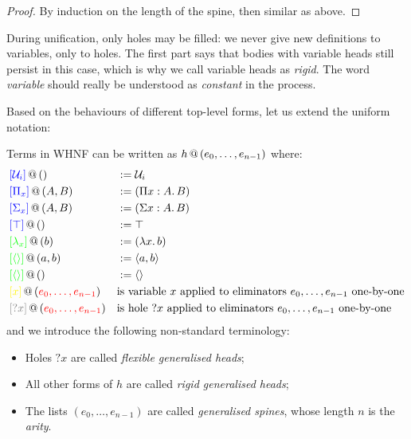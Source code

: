 \documentclass[twoside]{report}
\begin{document}
\begin{proof}
    By induction on the length of the spine, then similar as above.
\end{proof}

During unification, only holes may be filled: we never give new definitions to variables, only to holes. The first part says that bodies with variable heads still persist in this case, which is why we call variable heads as \emph{rigid}. The word \emph{variable} should really be understood as \emph{constant} in the process.

Based on the behaviours of different top-level forms, let us extend the uniform notation:

\begin{definition}
    \label{def:uniform_notation} Terms in WHNF can be written as ${h}\,@\,({e_0, \ldots, e_{n-1}})$ where:
    $$
        \begin{aligned}
        &\form {\textcolor{blue}{[\mathcal U_i]}} {} &&\defeq \mathcal U_i \\
        &\form {\textcolor{blue}{[\Pi_x]}} {A, B} &&\defeq (\ppi x A B) \\
        &\form {\textcolor{blue}{[\Sigma_x]}} {A, B} &&\defeq (\sig x A B) \\
        &\form {\textcolor{blue}{[\unit]}} {} &&\defeq \unit \\
        &\form {\textcolor{green}{[\lambda_x]}} {b} &&\defeq (\lam x b) \\
        &\form {\textcolor{green}{[\sstar]}} {a, b} &&\defeq \pair a b \\
        &\form {\textcolor{green}{[\sstar]}} {} &&\defeq \sstar \\
        &\form {\textcolor{yellow}{[x]}} {\textcolor{red}{e_0, \ldots, e_{n-1}}} &&\text{is variable $x$ applied to eliminators $e_0, \ldots, e_{n-1}$ one-by-one} \\
        &\form {\textcolor{gray}{[?x]}} {\textcolor{red}{e_0, \ldots, e_{n-1}}} &&\text{is hole ${?x}$ applied to eliminators $e_0, \ldots, e_{n-1}$ one-by-one} \\
        \end{aligned}
    $$
    and we introduce the following non-standard terminology:
    \begin{itemize}[noitemsep]
        \item Holes ${?x}$ are called \emph{flexible generalised heads};
        \item All other forms of $h$ are called \emph{rigid generalised heads};
        \item The lists $(e_0, \ldots, e_{n-1})$ are called \emph{generalised spines}, whose length $n$ is the \emph{arity}.
    \end{itemize}
\end{definition}
\end{document}
